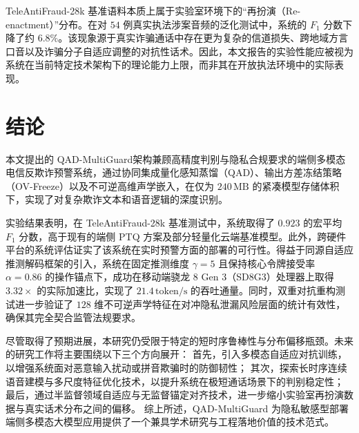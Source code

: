 \documentclass[11pt, a4paper]{article}
\begin{document}
TeleAntiFraud-28k 基准语料本质上属于实验室环境下的“再扮演（Re-enactment）”分布。在对 $54$ 例真实执法涉案音频的泛化测试中，系统的 $F_1$ 分数下降了约 $6.8\%$。该现象源于真实诈骗通话中存在更为复杂的信道损失、跨地域方言口音以及诈骗分子自适应调整的对抗性话术。因此，本文报告的实验性能应被视为系统在当前特定技术架构下的理论能力上限，而非其在开放执法环境中的实际表现。

\section{结论}

本文提出的 QAD-MultiGuard架构兼顾高精度判别与隐私合规要求的端侧多模态电信反欺诈预警系统，通过协同集成量化感知蒸馏（QAD）、输出方差冻结策略（OV-Freeze）以及不可逆高维声学嵌入，在仅为 $240\,\mathrm{MB}$ 的紧凑模型存储体积下，实现了对复杂欺诈文本和语音逻辑的深度识别。

实验结果表明，在 TeleAntiFraud-28k 基准测试中，系统取得了 $0.923$ 的宏平均 $F_1$ 分数，高于现有的端侧 PTQ 方案及部分轻量化云端基准模型。此外，跨硬件平台的系统评估证实了该系统在实时预警方面的部署的可行性。得益于同源自适应推测解码框架的引入，系统在固定推测维度 $\gamma = 5$ 且保持核心令牌接受率 $\alpha = 0.86$ 的操作锚点下，成功在移动端骁龙 8 Gen 3（SD8G3）处理器上取得 $3.32\times$ 的实际加速比，实现了 $21.4\,\mathrm{token/s}$ 的吞吐通量。同时，双重对抗重构测试进一步验证了 $128$ 维不可逆声学特征在对冲隐私泄漏风险层面的统计有效性，确保其完全契合监管法规要求。

尽管取得了预期进展，本研究仍受限于特定的短时序鲁棒性与分布偏移瓶颈。未来的研究工作将主要围绕以下三个方向展开：
首先，引入多模态自适应对抗训练，以增强系统面对恶意输入扰动或拼音欺骗时的防御韧性；
其次，探索长时序连续语音建模与多尺度特征优化技术，以提升系统在极短通话场景下的判别稳定性；
最后，通过半监督领域自适应与无监督锚定对齐技术，进一步缩小实验室再扮演数据与真实话术分布之间的偏移。
综上所述，QAD-MultiGuard 为隐私敏感型部署端侧多模态大模型应用提供了一个兼具学术研究与工程落地价值的技术范式。
\end{document}
